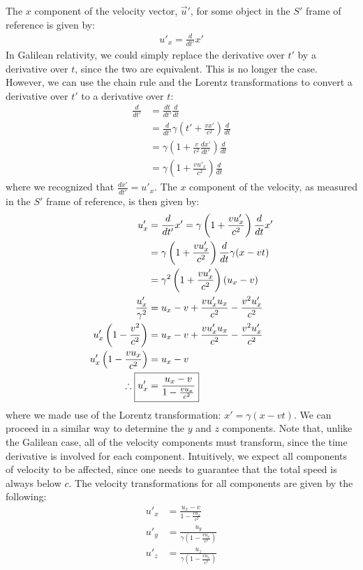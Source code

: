 The $x$ component of the velocity vector, $\vec u'$, for some object in the $S'$ frame of reference is given by:
\begin{align*}
u'_x = \frac{d}{dt'} x'
\end{align*}
In Galilean relativity, we could simply replace the derivative over $t'$ by a derivative over $t$, since the two are equivalent. This is no longer the case. However, we can use the chain rule and the Lorentz transformations to convert a derivative over $t'$ to a derivative over $t$:
\begin{align*}
\frac{d}{dt'} &= \frac{dt}{dt'}\frac{d}{dt}\\
&= \frac{d}{dt'} \gamma\left(t'+\frac{vx'}{c^2} \right)\frac{d}{dt}\\
&=\gamma \left(1+\frac{v}{c^2}\frac{dx'}{dt'}\right)\frac{d}{dt}\\
&=\gamma \left(1+\frac{vu'_x}{c^2}\right)\frac{d}{dt}
\end{align*}
where we recognized that $\frac{dx'}{dt'}=u'_x$. The $x$ component of the velocity, as measured in the $S'$ frame of reference, is then given by:
\begin{align*}
u'_x &= \frac{d}{dt'} x' = \gamma \left(1+\frac{vu'_x}{c^2}\right)\frac{d}{dt}x'\\
&=\gamma \left(1+\frac{vu'_x}{c^2}\right)\frac{d}{dt}\gamma (x-vt)\\
&=\gamma^2 \left(1+\frac{vu'_x}{c^2}\right)(u_x -v)\\
\frac{u'_x}{\gamma^2}&=u_x -v +\frac{vu'_xu_x}{c^2}-\frac{v^2u'_x}{c^2}\\
u'_x\left (1-\frac{v^2}{c^2}\right)&=u_x -v +\frac{vu'_xu_x}{c^2}-\frac{v^2u'_x}{c^2}\\
u'_x \left( 1- \frac{vu_x}{c^2}\right) &=u_x -v\\
\therefore \; \Aboxed{u'_x&=\frac{u_x -v}{1- \frac{vu_x}{c^2}}}
\end{align*}
where we made use of the Lorentz transformation: $x'=\gamma (x-vt)$. We can proceed in a similar way to determine the $y$ and $z$ components. Note that, unlike the Galilean case, all of the velocity components must transform, since the time derivative is involved for each component. Intuitively, we expect all components of velocity to be affected, since one needs to guarantee that the total speed is always below $c$. The velocity transformations for all components are given by the following:
\begin{align*}
u'_x&=\frac{u_x -v}{1- \frac{vu_x}{c^2}}\\
u'_y &=\frac{u_y}{\gamma\left(1- \frac{vu_x}{c^2}\right)}\\
u'_z &=\frac{u_z}{\gamma\left(1- \frac{vu_x}{c^2}\right)}
\end{align*}

